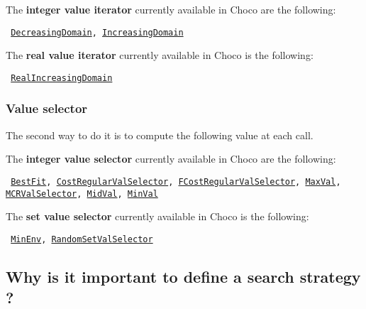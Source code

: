 \noindent The \textbf{integer value iterator} currently available in Choco are the following: 
\begin{notedef}\tt
\hyperlink{decreasingdomain:decreasingdomainvaliterator}{DecreasingDomain}, \hyperlink{increasingdomain:increasingdomainvaliterator}{IncreasingDomain}
\end{notedef}

\noindent The \textbf{real value iterator} currently available in Choco is the following: 
\begin{notedef}\tt
\hyperlink{realincreasingdomain:realincreasingdomainvaliterator}{RealIncreasingDomain}
\end{notedef}




\subsubsection{Value selector}\label{solver:valueselector}\hypertarget{solver:valueselector}{}
The second way to do it is to compute the following value at each call.

\noindent The \textbf{integer value selector} currently available in Choco are the following: 
\begin{notedef}\tt
\hyperlink{bestfit:bestfitvalselector}{BestFit}, \hyperlink{costregularvalselector:costregularvalselectorvalselector}{CostRegularValSelector}, \hyperlink{fcostregularvalselector:fcostregularvalselectorvalselector}{FCostRegularValSelector}, \hyperlink{maxval:maxvalvalselector}{MaxVal}, \hyperlink{mcrvalselector:mcrvalselectorvalselector}{MCRValSelector}, \hyperlink{midval:midvalvalselector}{MidVal}, \hyperlink{minval:minvalvalselector}{MinVal}
\end{notedef}

\noindent The \textbf{set value selector} currently available in Choco is the following: 
\begin{notedef}\tt
\hyperlink{minenv:minenvvalselector}{MinEnv}, \hyperlink{randomsetvalselector:randomsetvalselectorvalselector}{RandomSetValSelector}
\end{notedef}

\subsection{Why is it important to define a search strategy ?}\label{solver:whyisitimportanttodefineasearchstrategy}\hypertarget{solver:whyisitimportanttodefineasearchstrategy}{}

